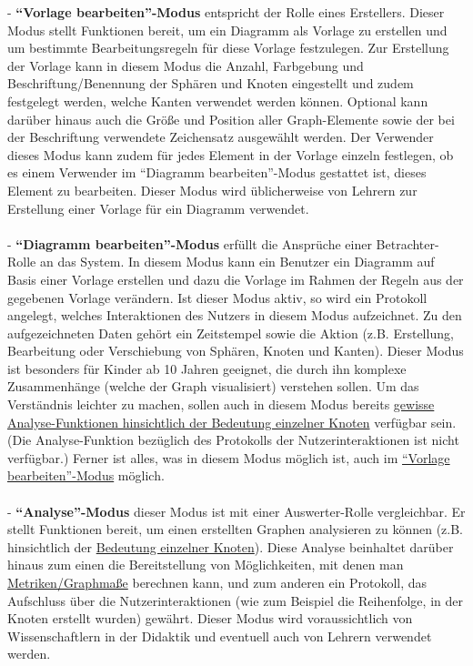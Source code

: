 \documentclass[enabledeprecatedfontcommands,fontsize=11pt,paper=a4,twoside]{scrartcl}
\newcounter{one}
\begin{document}
- \textbf{\hypertarget{``Vorlage bearbeiten''-Modus}{``Vorlage bearbeiten''-Modus}} entspricht der Rolle eines Erstellers. Dieser Modus stellt Funktionen bereit, um ein Diagramm als Vorlage zu erstellen und um bestimmte Bearbeitungsregeln für diese Vorlage festzulegen. Zur Erstellung der Vorlage kann in diesem Modus die Anzahl, Farbgebung und Beschriftung/Benennung der Sphären und Knoten eingestellt und zudem festgelegt werden, welche Kanten verwendet werden können. Optional kann darüber hinaus auch die Größe und Position aller Graph-Elemente sowie der bei der Beschriftung verwendete Zeichensatz ausgewählt werden. Der Verwender dieses Modus kann zudem für jedes Element in der Vorlage einzeln festlegen, ob es einem Verwender im ``Diagramm bearbeiten''-Modus gestattet ist, dieses Element zu bearbeiten. Dieser Modus wird üblicherweise von Lehrern zur Erstellung einer Vorlage für ein Diagramm verwendet. \\ \\
- \textbf{\hypertarget{``Diagramm bearbeiten''-Modus}{``Diagramm bearbeiten''-Modus}} erfüllt die Ansprüche einer Betrachter-Rolle an das System. In diesem Modus kann ein Benutzer ein Diagramm auf Basis einer Vorlage erstellen und dazu die Vorlage im Rahmen der Regeln aus der gegebenen Vorlage verändern. Ist dieser Modus aktiv, so wird ein Protokoll angelegt, welches Interaktionen des Nutzers in diesem Modus aufzeichnet. Zu den aufgezeichneten Daten gehört ein Zeitstempel sowie die Aktion (z.B. Erstellung, Bearbeitung oder Verschiebung von Sphären, Knoten und Kanten). Dieser Modus ist besonders für Kinder ab 10 Jahren geeignet, die durch ihn komplexe Zusammenhänge (welche der Graph visualisiert) verstehen sollen. Um das Verständnis leichter zu machen, sollen auch in diesem Modus bereits \hyperlink{Bedeutung eines Knoten}{gewisse Analyse-Funktionen hinsichtlich der Bedeutung einzelner Knoten} verfügbar sein. (Die Analyse-Funktion bezüglich des Protokolls der Nutzerinteraktionen ist nicht verfügbar.) Ferner ist alles, was in diesem Modus möglich ist, auch im \hyperlink{``Vorlage bearbeiten''-Modus}{``Vorlage bearbeiten''-Modus} möglich.\\ \\
- \textbf{\hypertarget{``Analyse''-Modus}{``Analyse''-Modus}} dieser Modus ist mit einer Auswerter-Rolle vergleichbar. Er stellt Funktionen bereit, um einen erstellten Graphen analysieren zu können (z.B. hinsichtlich der \hyperlink{Bedeutung eines Knoten}{Bedeutung einzelner Knoten}). Diese Analyse beinhaltet darüber hinaus zum einen die Bereitstellung von Möglichkeiten, mit denen man \hyperlink{Metriken/Graphmaße}{Metriken/Graphmaße} berechnen kann, und zum anderen ein Protokoll, das Aufschluss über die Nutzerinteraktionen (wie zum Beispiel die Reihenfolge, in der Knoten erstellt wurden) gewährt. Dieser Modus wird voraussichtlich von Wissenschaftlern in der Didaktik und eventuell auch von Lehrern verwendet werden. \\ \\
\end{document}
